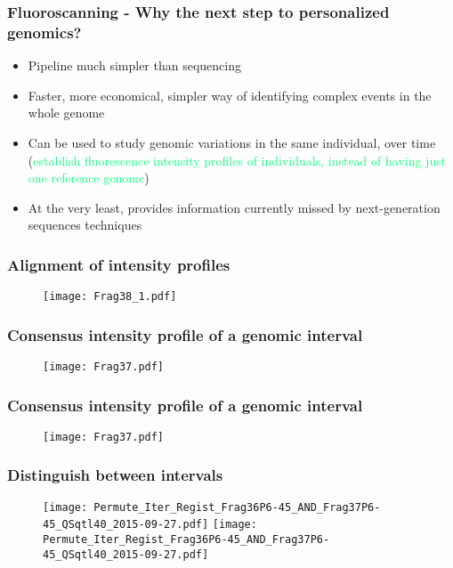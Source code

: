 \documentclass[10pt,dvipsnames,table]{beamer}
\begin{document}
\begin{frame}
\frametitle{Fluoroscanning - Why the next step to personalized genomics?}
\begin{itemize}
\item Pipeline much simpler than sequencing
\item Faster, more economical, simpler way of identifying complex events in the whole genome
\item Can be used to study genomic variations in the same individual, over time (\textcolor{SpringGreen} {establish fluorescence intensity profiles of individuals, instead of having just one reference genome})
\item At the very least, provides information currently missed by next-generation sequences techniques
\end{itemize}
\end{frame}

\begin{frame}
\frametitle{Alignment of intensity profiles}
\begin{figure}
\texttt{[image: Frag38\_1.pdf]}
\end{figure}
\end{frame}

\begin{frame}
\frametitle{Consensus intensity profile of a genomic interval}
\begin{figure}
\texttt{[image: Frag37.pdf]}
\end{figure}
\end{frame}

\begin{frame}
\frametitle{Consensus intensity profile of a genomic interval}
\begin{figure}
\texttt{[image: Frag37.pdf]}
\end{figure}
\end{frame}

\begin{frame}
\frametitle{Distinguish between intervals}
\begin{figure}
\texttt{[image: Permute\_Iter\_Regist\_Frag36P6-45\_AND\_Frag37P6-45\_QSqtl40\_2015-09-27.pdf]}
\texttt{[image: Permute\_Iter\_Regist\_Frag36P6-45\_AND\_Frag37P6-45\_QSqtl40\_2015-09-27.pdf]}
\end{figure}
\end{frame}
\end{document}
